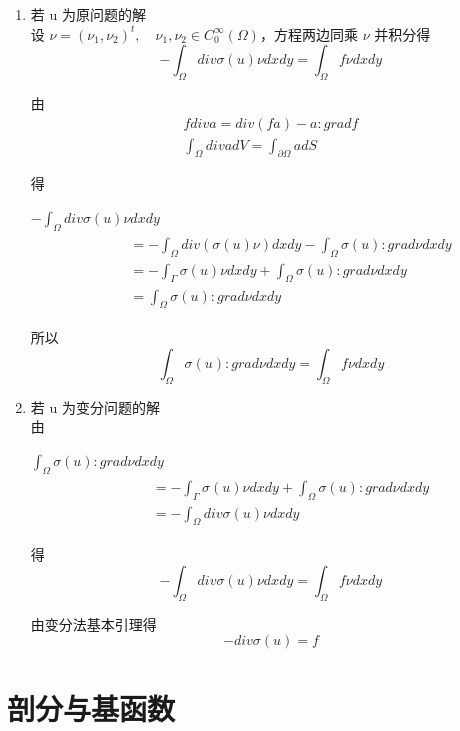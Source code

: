 \documentclass[UTF8,titlepage,twocolumn]{ctexart}
\begin{document}
\begin{enumerate}
	\item 若 u 为原问题的解 \\
	设 $\nu = (\nu_1,\nu_2)^t, \quad \nu_1, \nu_2 \in C_0^{\infty}(\Omega)$，方程两边同乘 $\nu$ 并积分得
	$$
		-\int_{\Omega} div \sigma(u) \nu dxdy = \int_{\Omega} f \nu dxdy
	$$
	
	由
	$$
		\begin{matrix}
			f div a = div(fa) - a : grad f \\
			\int_{\Omega} div a dV = \int_{\partial \Omega} a dS
		\end{matrix}
	$$
	
	得
	\par \quad \quad
	$-\int_{\Omega} div \sigma(u) \nu dxdy$
	$$ 
	\quad \quad
	\begin{matrix}
		\begin{aligned}
		&= -\int_{\Omega} div(\sigma(u) \nu) dxdy - \int_{\Omega} \sigma(u) : grad \nu dxdy \\
		&= -\int_{\Gamma} \sigma(u) \nu dxdy + \int_{\Omega} \sigma(u) : grad \nu dxdy \\
		&= \int_{\Omega} \sigma(u) : grad \nu dxdy 
		\end{aligned}
	\end{matrix}
	$$
	
	所以
	$$
		\int_{\Omega} \sigma(u) : grad \nu dxdy = \int_{\Omega} f \nu dxdy
	$$
	
	\item 若 u 为变分问题的解 \\
	由
	\par \quad \quad
	$\int_{\Omega} \sigma(u) : grad \nu dxdy$
	$$
	\quad \quad
	\begin{matrix}
		\begin{aligned}
			&= -\int_{\Gamma} \sigma(u) \nu dxdy + \int_{\Omega} \sigma(u) : grad \nu dxdy \\
			&= -\int_{\Omega} div \sigma(u) \nu dxdy
		\end{aligned}
	\end{matrix} 
	$$

	得
	$$
		-\int_{\Omega} div \sigma(u) \nu dxdy = \int_{\Omega} f \nu dxdy
	$$
	
	由变分法基本引理得
	$$
		-div \sigma(u) = f
	$$
	
\end{enumerate}

\section{剖分与基函数}
\end{document}
